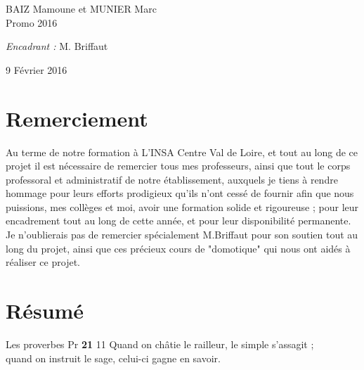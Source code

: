 {\begin{titlepage}
\begin{sffamily}
\begin{center}
    \begin{minipage}{0.4\textwidth}
      \begin{flushleft} \large
        BAIZ Mamoune et MUNIER Marc \\
        Promo 2016\\
      \end{flushleft}
    \end{minipage}
    \begin{minipage}{0.4\textwidth}
      \begin{flushright} \large
        \emph{Encadrant :} M. Briffaut\\
      \end{flushright}
    \end{minipage}

    \vfill

    {\large 9 Février 2016}

  \end{center}
  \end{sffamily}
\end{titlepage}
}
\newpage
\newpage



\newpage
\section*{Remerciement}
Au terme de notre formation à L’INSA Centre Val de Loire, et tout au long de ce projet il est nécessaire de remercier tous mes professeurs, ainsi que tout le corps professoral et administratif de notre établissement, auxquels je tiens à rendre hommage pour leurs efforts prodigieux qu’ils n’ont cessé de fournir afin que nous puissions, mes collèges et moi, avoir une formation solide et rigoureuse ; pour leur encadrement tout au long de cette année, et pour leur disponibilité permanente. Je n’oublierais pas de remercier spécialement M.Briffaut pour son soutien tout au long du projet, ainsi que ces précieux cours de "domotique" qui nous ont aidés à réaliser ce projet.\newline

\clearpage
\newpage
\section*{Résumé}
\vspace{20pt} 
\label{chap-savoir}
\begin{epigraphe}{Les proverbes Pr \textbf{21} 11}
Quand on châtie le railleur, le simple s’assagit ;\\
quand on instruit le sage, celui-ci gagne en savoir.
\end{epigraphe}

